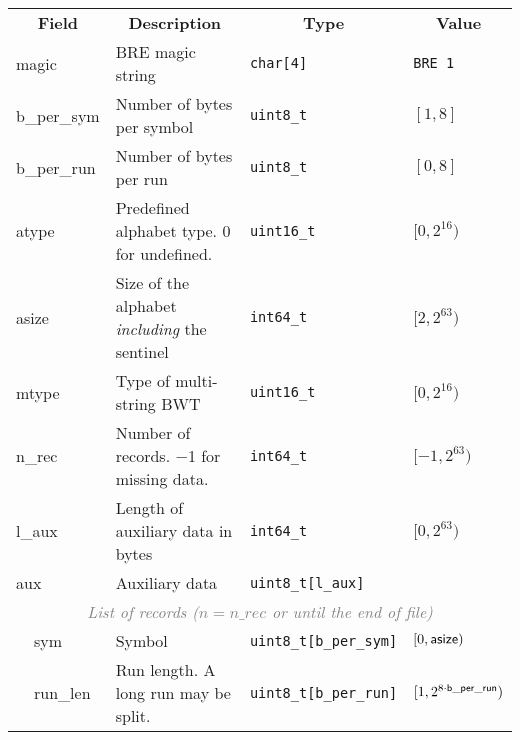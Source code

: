 \documentclass[10pt]{article}
\begin{document}
\begin{table}[ht]
\centering
{\small
\begin{tabular}{|l|l|p{6.7cm}|l|l|}
  \cline{1-5}
  \multicolumn{2}{|c|}{\bf Field} & \multicolumn{1}{c|}{\bf Description} & \multicolumn{1}{c|}{\bf Type} & \multicolumn{1}{c|}{\bf Value} \\\cline{1-5}
  \multicolumn{2}{|l|}{\sf magic} & BRE magic string & {\tt char[4]} & {\tt BRE\char92 1}\\\cline{1-5}
  \multicolumn{2}{|l|}{\sf b\_per\_sym} & Number of bytes per symbol & {\tt uint8\_t} & $[1,8]$ \\\cline{1-5}
  \multicolumn{2}{|l|}{\sf b\_per\_run} & Number of bytes per run & {\tt uint8\_t} & $[0,8]$ \\\cline{1-5}
  \multicolumn{2}{|l|}{\sf atype} & Predefined alphabet type. 0 for undefined. & {\tt uint16\_t} & $[0,2^{16})$ \\\cline{1-5}
  \multicolumn{2}{|l|}{\sf asize} & Size of the alphabet \emph{including} the sentinel & {\tt int64\_t} & $[2,2^{63})$ \\\cline{1-5}
  \multicolumn{2}{|l|}{\sf mtype} & Type of multi-string BWT & {\tt uint16\_t} & $[0,2^{16})$ \\\cline{1-5}
  \multicolumn{2}{|l|}{\sf n\_rec} & Number of records. $-$1 for missing data. & {\tt int64\_t} & $[-1,2^{63})$ \\\cline{1-5}
  \multicolumn{2}{|l|}{\sf l\_aux} & Length of auxiliary data in bytes & {\tt int64\_t} & $[0,2^{63})$ \\\cline{1-5}
  \multicolumn{2}{|l|}{\sf aux} & Auxiliary data & {\tt uint8\_t[l\_aux]} & \\\cline{1-5}
  \multicolumn{5}{|c|}{\textcolor{gray}{\it List of records ($n=n\_rec$ or until the end of file)}} \\\cline{2-5}
  & {\sf sym} & Symbol & {\tt uint8\_t[b\_per\_sym]} & $[0,{\sf asize})$ \\\cline{2-5}
  & {\sf run\_len} & Run length. A long run may be split. & {\tt uint8\_t[b\_per\_run]} & $[1,2^{8\cdot{\sf b\_per\_run}})$ \\\cline{2-5}
  \cline{1-5}
\end{tabular}}
\end{table}
\end{document}
